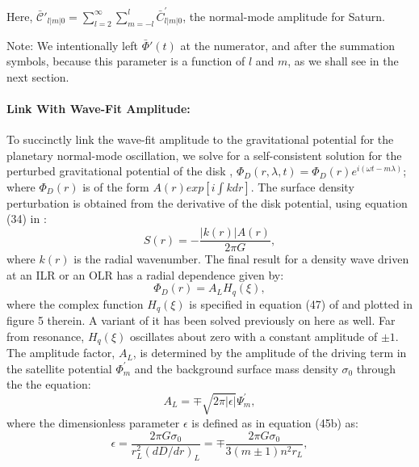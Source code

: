 \documentclass{article}
\begin{document}
Here, $\mathscr{\bar{C}'}_{l|m|0} = \sum_{l=2}^{\infty}\sum_{m=-l}^{l}\bar{C}_{l|m|0}^{'}$, the normal-mode amplitude for Saturn.

Note: 
We intentionally left $\bar{\Phi}{'}(t)$ at the numerator, and after the summation symbols, because this parameter is a function of $l$ and $m$, as we shall see in the next section. 

\vspace{3pt}

\paragraph{Link With Wave-Fit Amplitude:}

\vspace{3pt}

To succinctly link the wave-fit amplitude to the gravitational potential for the planetary normal-mode oscillation, we solve for a self-consistent solution for the perturbed gravitational potential of the disk \cite{1984prin.conf..513S}, $\Phi_{D}(r,\lambda,t) = \Phi_{D}(r)e^{i(\omega t - m \lambda)}$; where $\Phi_{D}(r)$ is of the form $A(r)exp[i\int k dr]$. The surface density perturbation is obtained from the derivative of the disk potential, using equation (34) in \cite{1984prin.conf..513S}:
\begin{equation}
    S(r) = - \frac{|k(r)|A(r)}{2\pi G},
\end{equation}
where $k(r)$ is the radial wavenumber. The final result for a density wave driven at an ILR or an OLR has a radial dependence given by:
\begin{equation}
    \Phi_{D}(r) = A_{L}H_{q}(\xi),
\end{equation}
where the complex function $H_{q}(\xi)$ is specified in equation (47) of \cite{1984prin.conf..513S} and plotted in figure 5 therein. A variant of it has been solved previously on here as well. Far from resonance, $H_{q}(\xi)$ oscillates about zero with a constant amplitude of $\pm1$. The amplitude factor, $A_{L}$, is determined by the amplitude of the driving term in the satellite potential $\Phi_{m}^{'}$ and the background surface mass density $\sigma_{0}$ through the the equation:
\begin{equation}
    A_{L} = \mp\sqrt{2\pi|\epsilon|}\Psi_{m}^{'},
\end{equation}
where the dimensionless parameter $\epsilon$ is defined as in \cite{1984prin.conf..513S} equation (45b) as:
\begin{equation}
    \epsilon = \frac{2\pi G \sigma_{0}}{r_{L}^{2}(dD/dr)_{L}} = \mp \frac{2\pi G \sigma_{0}}{3(m\pm1)n^{2}r_{L}},
\end{equation}
\end{document}
